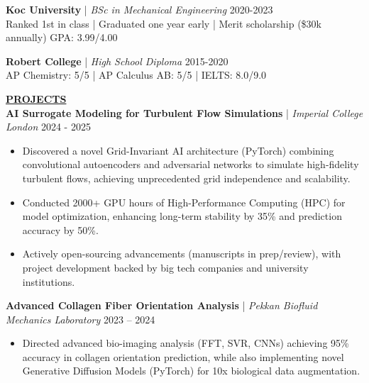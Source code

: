 \documentclass{article}
\newlength{\remaining}
\renewcommand{\section}[1]{
  \vspace{1.0em}\setlength{\remaining}{\textwidth-\widthof{\uppercase{#1}}}
    \noindent\underline{\fontsize{10}{15}\bfseries\uppercase{#1}\hspace*{\remaining}} \\
}
\renewcommand{\subsection}[3]{
    \noindent\textbf{#1} | \emph{#2} \hfill #3  
}
\begin{document}
    \subsection{Koc University}{BSc in Mechanical Engineering}{2020-2023} \\
    Ranked 1st in class | Graduated one year early | Merit scholarship (\$30k annually) \hfill GPA: 3.99/4.00

    \vspace{0.25em}

    \subsection{Robert College}{High School Diploma}{2015-2020} \\
    AP Chemistry: 5/5 | AP Calculus AB: 5/5 | IELTS: 8.0/9.0

    \section{Projects}
    \subsection{AI Surrogate Modeling for Turbulent Flow Simulations}{Imperial College London}{2024 - 2025} 
    \begin{itemize} 
        \item Discovered a novel Grid-Invariant AI architecture (PyTorch) combining convolutional autoencoders and adversarial networks to simulate high-fidelity turbulent flows, achieving unprecedented grid independence and scalability.
        \item Conducted 2000+ GPU hours of High-Performance Computing (HPC) for model optimization, enhancing long-term stability by 35\% and prediction accuracy by 50\%.
        \item Actively open-sourcing advancements (manuscripts in prep/review), with project development backed by big tech companies and university institutions.
    \end{itemize}

    \subsection{Advanced Collagen Fiber Orientation Analysis}{Pekkan Biofluid Mechanics Laboratory}{2023 – 2024}
    \begin{itemize}
        \item Directed advanced bio-imaging analysis (FFT, SVR, CNNs) achieving 95\% accuracy in collagen orientation prediction, while also implementing novel Generative Diffusion Models (PyTorch) for 10x biological data augmentation.
    \end{itemize}
\end{document}
